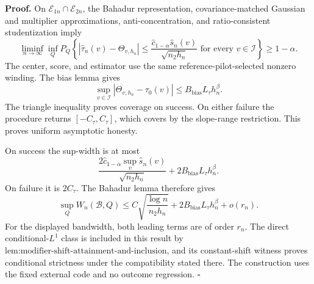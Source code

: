 \textbf{Proof.}
On \(\mathcal E_{1n}\cap\mathcal E_{2n}\), the Bahadur representation, covariance-matched Gaussian and multiplier approximations, anti-concentration, and ratio-consistent studentization imply
\[
 \liminf_{n\to\infty}\inf_QP_Q\left\{
 |\widehat\tau_n(v)-\Theta_{v,h_n}|
 \le\frac{\widehat c_{1-\alpha}\widehat s_n(v)}{\sqrt{n_2h_n}}
 \text{ for every }v\in\mathcal I\right\}\ge1-\alpha. \tag{1}
\]
The center, score, and estimator use the same reference-pilot-selected nonzero winding.  The bias lemma gives
\[
 \sup_{v\in\mathcal I}|\Theta_{v,h_n}-\tau_0(v)|
 \le B_{\mathrm{bias}}L_\tau h_n^\beta. \tag{2}
\]
The triangle inequality proves coverage on success.  On either failure the procedure returns \([-C_\tau,C_\tau]\), which covers by the slope-range restriction.  This proves uniform asymptotic honesty.

On success the sup-width is at most
\[
 \frac{2\widehat c_{1-\alpha}\sup_v\widehat s_n(v)}{\sqrt{n_2h_n}}
 +2B_{\mathrm{bias}}L_\tau h_n^\beta. \tag{3}
\]
On failure it is \(2C_\tau\).  The Bahadur lemma therefore gives
\[
 \sup_QW_n(\mathcal B,Q)
 \le C\sqrt{\frac{\log n}{n_2h_n}}
 +2B_{\mathrm{bias}}L_\tau h_n^\beta+o(r_n). \tag{4}
\]
For the displayed bandwidth, both leading terms are of order \(r_n\).  The direct conditional-\(L^1\) class is included in this result by \(\text{lem:modifier-shift-attainment-and-inclusion}\), and its constant-shift witness proves conditional strictness under the compatibility stated there.  The construction uses the fixed external code and no outcome regression. \(\square\)